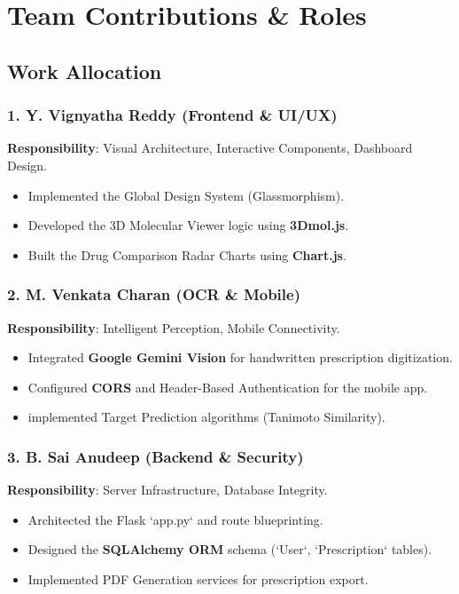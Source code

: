 \documentclass[a4paper,12pt]{report}
\begin{document}
\newpage

\part{Team Contributions \& Roles}

\chapter{Work Allocation}

\section{1. Y. Vignyatha Reddy (Frontend \& UI/UX)}
\textbf{Responsibility}: Visual Architecture, Interactive Components, Dashboard Design.
\begin{itemize}
    \item Implemented the Global Design System (Glassmorphism).
    \item Developed the 3D Molecular Viewer logic using \textbf{3Dmol.js}.
    \item Built the Drug Comparison Radar Charts using \textbf{Chart.js}.
\end{itemize}

\section{2. M. Venkata Charan (OCR \& Mobile)}
\textbf{Responsibility}: Intelligent Perception, Mobile Connectivity.
\begin{itemize}
    \item Integrated \textbf{Google Gemini Vision} for handwritten prescription digitization.
    \item Configured \textbf{CORS} and Header-Based Authentication for the mobile app.
    \item implemented Target Prediction algorithms (Tanimoto Similarity).
\end{itemize}

\section{3. B. Sai Anudeep (Backend \& Security)}
\textbf{Responsibility}: Server Infrastructure, Database Integrity.
\begin{itemize}
    \item Architected the Flask `app.py` and route blueprinting.
    \item Designed the \textbf{SQLAlchemy ORM} schema (`User`, `Prescription` tables).
    \item Implemented PDF Generation services for prescription export.
\end{itemize}
\end{document}
